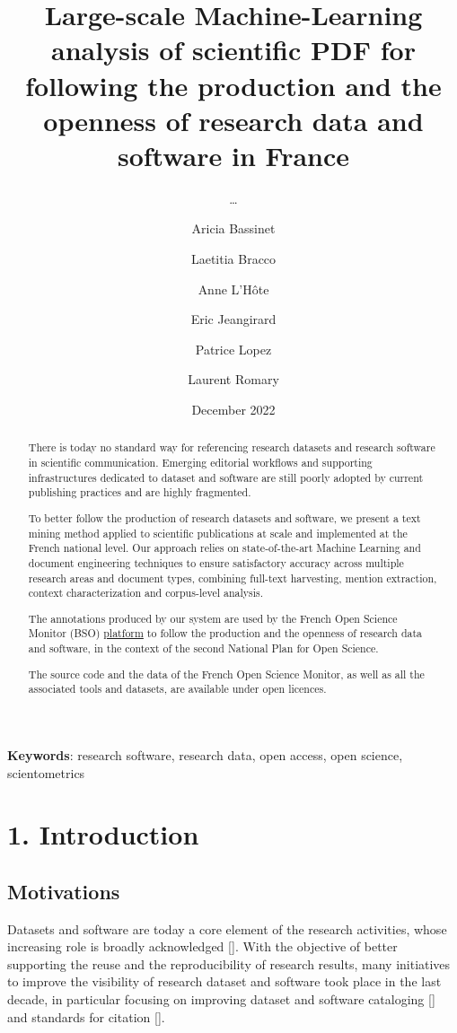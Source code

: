 \documentclass[
]{article}
\title{Large-scale Machine-Learning analysis of scientific PDF for
following the production and the openness of research data and software
in France}
\subtitle{\ldots{}}
\author[%
  2%
  ]{%
  Aricia Bassinet%
}
\author[%
  2%
  ]{%
  Laetitia Bracco%
}
\author[%
  1%
  ]{%
  Anne L'Hôte%
}
\author[%
  1%
  ]{%
  Eric Jeangirard%
}
\author[%
  3%
  ]{%
  Patrice Lopez%
}
\author[%
  4%
  ]{%
  Laurent Romary%
}
\affil[1]{French Ministry of Higher Education, Research, Paris, France}
\affil[2]{University of Lorraine, France}
\affil[3]{science-miner, France}
\affil[4]{Inria, France}
\date{December 2022}
\begin{document}
\maketitle
\begin{abstract}
There is today no standard way for referencing research datasets and
research software in scientific communication. Emerging editorial
workflows and supporting infrastructures dedicated to dataset and
software are still poorly adopted by current publishing practices and
are highly fragmented.

To better follow the production of research datasets and software, we
present a text mining method applied to scientific publications at scale
and implemented at the French national level. Our approach relies on
state-of-the-art Machine Learning and document engineering techniques to
ensure satisfactory accuracy across multiple research areas and document
types, combining full-text harvesting, mention extraction, context
characterization and corpus-level analysis.

The annotations produced by our system are used by the French Open
Science Monitor (BSO)
\href{https://frenchopensciencemonitor.esr.gouv.fr}{platform} to follow
the production and the openness of research data and software, in the
context of the second National Plan for Open Science.

The source code and the data of the French Open Science Monitor, as well
as all the associated tools and datasets, are available under open
licences.
\end{abstract}

\textbf{Keywords}: research software, research data, open access, open
science, scientometrics

\hypertarget{introduction}{%
\section{1. Introduction}\label{introduction}}

\hypertarget{motivations}{%
\subsection{Motivations}\label{motivations}}

Datasets and software are today a core element of the research
activities, whose increasing role is broadly acknowledged {[}{]}. With
the objective of better supporting the reuse and the reproducibility of
research results, many initiatives to improve the visibility of research
dataset and software took place in the last decade, in particular
focusing on improving dataset and software cataloging {[}{]} and
standards for citation {[}{]}.
\end{document}

